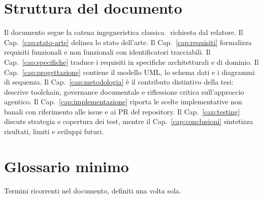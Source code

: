 \section{Struttura del documento}
Il documento segue la catena ingegneristica classica~\cite{sommerville2016}
richiesta dal relatore. Il
Cap.~\ref{cap:stato-arte} delinea lo stato dell'arte. Il
Cap.~\ref{cap:requisiti} formalizza requisiti funzionali e non funzionali con
identificatori tracciabili. Il Cap.~\ref{cap:specifiche} traduce i requisiti in
specifiche architetturali e di dominio. Il Cap.~\ref{cap:progettazione}
contiene il modello UML, lo schema dati e i diagrammi di sequenza. Il
Cap.~\ref{cap:metodologia} è il contributo distintivo della tesi: descrive
toolchain, governance documentale e riflessione critica
sull'approccio agentico. Il Cap.~\ref{cap:implementazione} riporta le scelte
implementative non banali con riferimento alle issue e ai PR del repository. Il
Cap.~\ref{cap:testing} discute strategia e copertura dei test, mentre il
Cap.~\ref{cap:conclusioni} sintetizza risultati, limiti e sviluppi futuri.

\section{Glossario minimo}
\label{sec:glossario}
Termini ricorrenti nel documento, definiti una volta sola.

